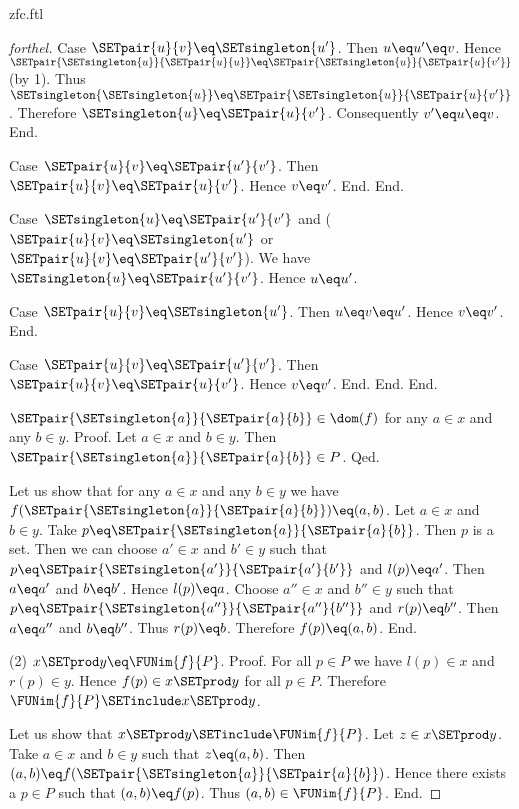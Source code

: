 \documentclass{naproche-library}
\begin{document}
\begin{smodule}[title=ZFC]{zfc.ftl}
\begin{proof}[forthel]
      Case $\SETpair{u}{v} \eq \SETsingleton{u'}$.
        Then $u \eq u'\eq v$.
        Hence $\SETpair{\SETsingleton{u}}{\SETpair{u}{u}} \eq \SETpair{\SETsingleton{u}}{\SETpair{u}{v'}}$ (by 1).
        Thus $\SETsingleton{\SETsingleton{u}} \eq \SETpair{\SETsingleton{u}}{\SETpair{u}{v'}}$.
        Therefore $\SETsingleton{u} \eq \SETpair{u}{v'}$.
        Consequently $v' \eq u \eq v$.
      End.

      Case $\SETpair{u}{v} \eq \SETpair{u'}{v'}$.
        Then $\SETpair{u}{v} \eq \SETpair{u}{v'}$.
        Hence $v \eq v'$.
      End.
    End.

    Case $\SETsingleton{u} \eq \SETpair{u'}{v'}$ and ($\SETpair{u}{v} \eq \SETsingleton{u'}$ or $\SETpair{u}{v} \eq \SETpair{u'}{v'}$).
      We have $\SETsingleton{u} \eq \SETpair{u'}{v'}$.
      Hence $u \eq u'$.

      Case $\SETpair{u}{v} \eq \SETsingleton{u'}$.
        Then $u \eq v \eq u'$.
        Hence $v \eq v'$.
      End.

      Case $\SETpair{u}{v} \eq \SETpair{u'}{v'}$.
        Then $\SETpair{u}{v} \eq \SETpair{u}{v'}$.
        Hence $v \eq v'$.
      End.
    End.
  End.

  $\SETpair{\SETsingleton{a}}{\SETpair{a}{b}} \in \dom(f)$ for any $a \in x$ and any $b \in y$. \newline %
  Proof.
    Let $a \in x$ and $b \in y$.
    Then $\SETpair{\SETsingleton{a}}{\SETpair{a}{b}} \in P$.
  Qed.

  Let us show that for any $a \in x$ and any $b \in y$ we have $f(\SETpair{\SETsingleton{a}}{\SETpair{a}{b}}) \eq (a,b)$.
    Let $a \in x$ and $b \in y$.
    Take $p \eq \SETpair{\SETsingleton{a}}{\SETpair{a}{b}}$.
    Then $p$ is a set.
    Then we can choose $a' \in x$ and $b' \in y$ such that $p \eq \SETpair{\SETsingleton{a'}}{\SETpair{a'}{b'}}$ and $l(p) \eq a'$.
    Then $a \eq a'$ and $b \eq b'$.
    Hence $l(p) \eq a$.
    Choose $a'' \in x$ and $b'' \in y$ such that $p \eq \SETpair{\SETsingleton{a''}}{\SETpair{a''}{b''}}$ and $r(p) \eq b''$.
    Then $a \eq a''$ and $b \eq b''$.
    Thus $r(p) \eq b$.
    Therefore $f(p) \eq (a,b)$.
  End.

  (2) $x \SETprod y \eq \FUNim{f}{P}$. \newline
  Proof.
    For all $p \in P$ we have $l(p) \in x$ and $r(p) \in y$.
    Hence $f(p) \in x \SETprod y$ for all $p \in P$.
    Therefore $\FUNim{f}{P} \SETinclude x \SETprod y$.

    Let us show that $x \SETprod y \SETinclude \FUNim{f}{P}$.
      Let $z \in x \SETprod y$.
      Take $a \in x$ and $b \in y$ such that $z \eq (a,b)$.
      Then $(a,b) \eq f(\SETpair{\SETsingleton{a}}{\SETpair{a}{b}})$.
      Hence there exists a $p \in P$ such that $(a,b) \eq f(p)$.
      Thus $(a,b) \in \FUNim{f}{P}$.
    End.


\end{proof}
\end{smodule}
\end{document}
